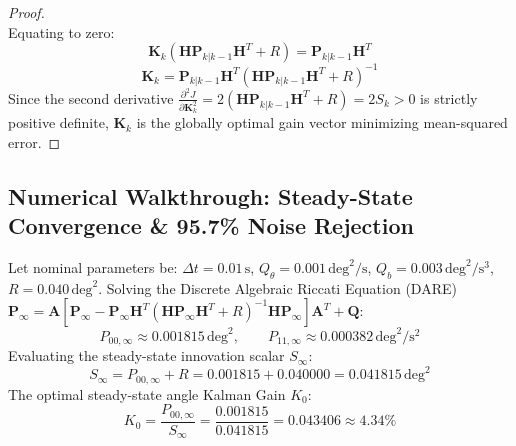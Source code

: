 \documentclass[11pt, a4paper]{article}
\begin{document}
\begin{proof}
\begin{equation}
\end{equation}
Equating to zero:
\begin{equation}
    \mathbf{K}_k (\mathbf{H}\mathbf{P}_{k|k-1}\mathbf{H}^T + R) = \mathbf{P}_{k|k-1} \mathbf{H}^T
\end{equation}
\begin{equation}
    \mathbf{K}_k = \mathbf{P}_{k|k-1} \mathbf{H}^T (\mathbf{H}\mathbf{P}_{k|k-1}\mathbf{H}^T + R)^{-1}
\end{equation}
Since the second derivative $\frac{\partial^2 J}{\partial \mathbf{K}_k^2} = 2(\mathbf{H}\mathbf{P}_{k|k-1}\mathbf{H}^T + R) = 2 S_k > 0$ is strictly positive definite, $\mathbf{K}_k$ is the globally optimal gain vector minimizing mean-squared error.
\end{proof}

\subsection{Numerical Walkthrough: Steady-State Convergence \& 95.7\% Noise Rejection}
Let nominal parameters be: $\Delta t = 0.01\,\text{s}$, $Q_\theta = 0.001\,\text{deg}^2/\text{s}$, $Q_b = 0.003\,\text{deg}^2/\text{s}^3$, $R = 0.040\,\text{deg}^2$.
Solving the Discrete Algebraic Riccati Equation (DARE) $\mathbf{P}_\infty = \mathbf{A} [\mathbf{P}_\infty - \mathbf{P}_\infty \mathbf{H}^T (\mathbf{H} \mathbf{P}_\infty \mathbf{H}^T + R)^{-1} \mathbf{H} \mathbf{P}_\infty] \mathbf{A}^T + \mathbf{Q}$:
\begin{equation}
    P_{00, \infty} \approx 0.001815\,\text{deg}^2, \qquad P_{11, \infty} \approx 0.000382\,\text{deg}^2/\text{s}^2
\end{equation}
Evaluating the steady-state innovation scalar $S_\infty$:
\begin{equation}
    S_\infty = P_{00, \infty} + R = 0.001815 + 0.040000 = 0.041815\,\text{deg}^2
\end{equation}
The optimal steady-state angle Kalman Gain $K_0$:
\begin{equation}
    K_0 = \frac{P_{00, \infty}}{S_\infty} = \frac{0.001815}{0.041815} = \mathbf{0.043406} \approx \mathbf{4.34\%}
\end{equation}
\end{document}
